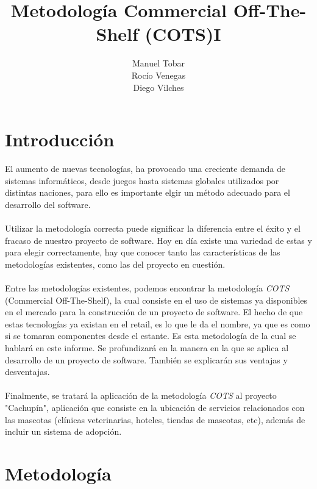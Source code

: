 \documentclass{udpreport}
\title{Metodología Commercial Off-The-Shelf (COTS)I}
\author{Manuel Tobar\\Rocío Venegas\\Diego Vilches}
\begin{document}
\maketitle
\tableofcontents
\chapter{Introducción}

    El aumento de nuevas tecnologías, ha provocado una creciente demanda de sistemas informáticos, desde juegos hasta sistemas globales utilizados por distintas naciones, para ello es importante elgir un método  adecuado para el desarrollo del software.\\\\
	Utilizar la metodología correcta puede significar la diferencia entre el éxito y el fracaso de nuestro proyecto de software. Hoy en día existe una variedad de estas y para elegir correctamente, hay que conocer tanto las características de las metodologías existentes, como las del proyecto en cuestión.
	\\\\
	Entre las metodologías existentes, podemos encontrar la metodología \emph{COTS} (Commercial Off-The-Shelf), la cual consiste en el uso de sistemas ya disponibles en el mercado para la construcción de un proyecto de software. El hecho de que estas tecnologías ya existan en el retail, es lo que le da el nombre, ya que es como si se tomaran componentes desde el estante. Es esta metodología de la cual se hablará en este informe. Se profundizará en la manera en la que se aplica al desarrollo de un proyecto de software. También se explicarán sus ventajas y desventajas.
	\\\\
	Finalmente, se tratará la aplicación de la metodología \emph{COTS} al proyecto "Cachupín", aplicación que consiste en la ubicación de servicios relacionados con las mascotas (clínicas veterinarias, hoteles, tiendas de mascotas, etc), además de incluir un sistema de adopción.
	
	

\chapter{Metodología}
\end{document}
